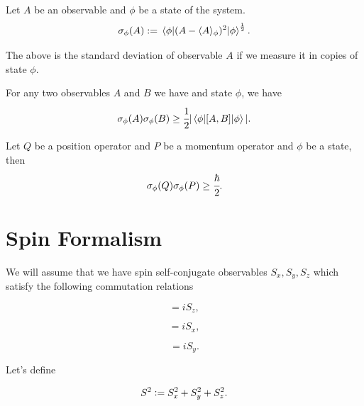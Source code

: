 \documentclass[main.tex]{subfiles}
\begin{document}
\begin{definition}
Let $A$ be an observable and $\phi$ be a state of the system.
\begin{equation}
\sigma_\phi(A) := \mel{\phi}{(A - \langle A \rangle_\phi)^2}{\phi}^{\frac{1}{2}}.
\end{equation}
\end{definition}
The above is the standard deviation of observable $A$ if we measure it in copies of state $\phi$.

\begin{theorem}
For any two observables $A$ and $B$ we have and state $\phi$, we have
\begin{equation}
\sigma_\phi(A)\sigma_\phi(B) \geq \cfrac{1}{2} |\mel{\phi}{[A,B]}{\phi}|.
\end{equation}
\end{theorem}
\begin{corollary} Let $Q$ be a position operator and $P$ be a momentum operator and $\phi$ be a state, then
\begin{equation} 
\sigma_\phi(Q)\sigma_\phi(P) \geq \cfrac{\hbar}{2}.
\end{equation}
\end{corollary}
\section{Spin Formalism}
We will assume that we have spin self-conjugate observables $S_x, S_y, S_z$ which satisfy the following commutation relations

\begin{equation}
[S_x, S_y] = iS_z,
\end{equation}

\begin{equation}
[S_y, S_z] = iS_x,
\end{equation}

\begin{equation}
[S_z, S_x] = iS_y.
\end{equation}

Let's define

\begin{equation}
S^2 \vcentcolon= S^2_x + S^2_y + S^2_z.
\end{equation}
\end{document}
